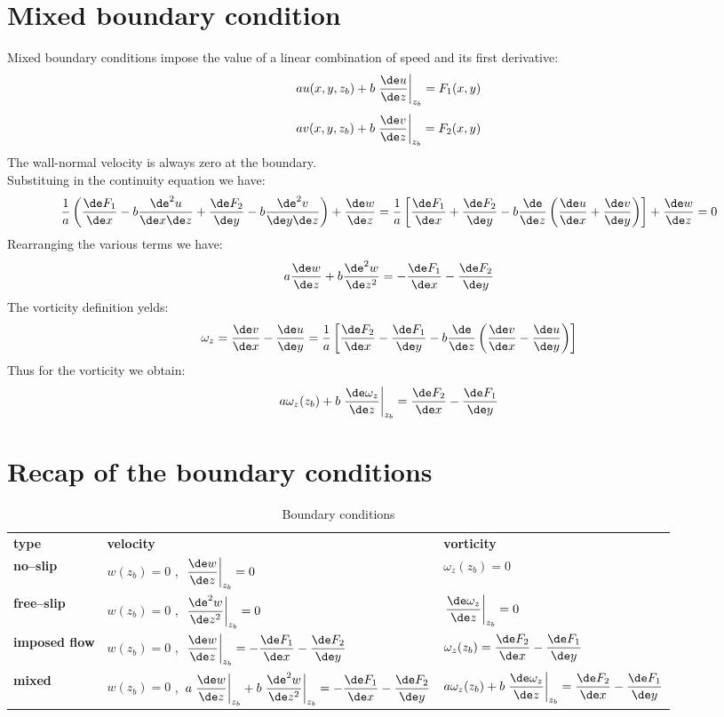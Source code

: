 \section{Mixed boundary condition}
Mixed boundary conditions impose the value of a linear combination of speed and its first derivative:
\[
au(x,y,z_b)+b\left.\frac{\de u}{\de z}\right|_{z_b}=F_1(x,y)
\]
\[
av(x,y,z_b)+b\left.\frac{\de v}{\de z}\right|_{z_b}=F_2(x,y)
\]
The wall-normal velocity is always zero at the boundary.\\
Substituing in the continuity equation we have:
\[
\frac{1}{a}\left( \frac{\de F_1}{\de x}-b\frac{\de^2 u}{\de x\de z}+\frac{\de F_2}{\de y}-b\frac{\de^2 v}{\de y\de z} \right)+\frac{\de w}{\de z}=\frac{1}{a}\left[ \frac{\de F_1}{\de x}+\frac{\de F_2}{\de y}-b\frac{\de}{\de z}\left(\frac{\de u}{\de x}+\frac{\de v}{\de y} \right)\right]+\frac{\de w}{\de z}=0
\]
Rearranging the various terms we have:
\[
a\frac{\de w}{\de z}+b\frac{\de^2 w}{\de z^2}=-\dfrac{\de F_1}{\de x}-\dfrac{\de F_2}{\de y} 
\]
The vorticity definition yelds:
\[
\omega_z=\frac{\de v}{\de x}-\frac{\de u}{\de y}=\frac{1}{a}\left[ \frac{\de F_2}{\de x}-\frac{\de F_1}{\de y}-b\frac{\de}{\de z}\left(\frac{\de v}{\de x}-\frac{\de u}{\de y}   \right)  \right]
\]
Thus for the vorticity we obtain:
\[
a\omega_z(z_b)+b\left.\frac{\de \omega_z}{\de z}\right|_{z_b}=\frac{\de F_2}{\de x}-\frac{\de F_1}{\de y}
\]


\section{Recap of the boundary conditions}
\renewcommand\arraystretch{2.5}
\begin{table}[H]
\centering
\caption{Boundary conditions}
\begin{tabular}{>{\raggedright\arraybackslash}p{2.5cm}| >{\centering\arraybackslash}p{8 cm} |>{\centering\arraybackslash}p{5.2cm}}
\textbf{type} & \textbf{velocity} & \textbf{vorticity}\\
\textbf{no--slip} & $w(z_b)=0$ ,\, $\left.\dfrac{\de w}{\de z}\right|_{z_b}=0$ & $\omega_z(z_b)=0$ \\
\textbf{free--slip} &   $w(z_b)=0$ ,\, $\left.\dfrac{\de^2 w}{\de z^2}\right|_{z_b}=0$& $\left. \dfrac{\de \omega_z}{\de z} \right|_{z_b}=0$  \\
\textbf{imposed flow} & $w(z_b)=0$ ,\, $\left.\dfrac{\de w}{\de z}\right|_{z_b}=-\dfrac{\de F_1}{\de x}-\dfrac{\de F_2}{\de y} $ & $\omega_z(z_b)=\dfrac{\de F_2}{\de x}-\dfrac{\de F_1}{\de y}$  \\ 
\textbf{mixed} & $w(z_b)=0$ ,\, $a\left.\dfrac{\de w}{\de z}\right|_{z_b}+b\left.\dfrac{\de^2 w}{\de z^2}\right|_{z_b}=-\dfrac{\de F_1}{\de x}-\dfrac{\de F_2}{\de y} $ & $a\omega_z(z_b)+b\left.\dfrac{\de \omega_z}{\de z}\right|_{z_b}=\dfrac{\de F_2}{\de x}-\dfrac{\de F_1}{\de y}$\\
\end{tabular}
\end{table}
\renewcommand\arraystretch{1}





